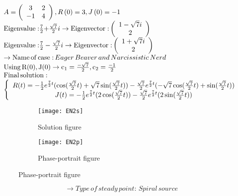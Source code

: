 \documentclass[a4paper]{article}
\begin{document}
\[\begin{array}{l}
A = \left( {\begin{array}{*{20}{c}}
3&2\\
{ - 1}&4
\end{array}} \right),R\left( 0 \right) = 3,J\left( 0 \right) =  - 1\\
{\rm{Eigenvalue:}}\frac{7}{2}{\rm{ + }}\frac{{\sqrt 7 }}{2}i \to {\rm{Eigenvector:}}\left( {\begin{array}{*{20}{c}}
{1 - \sqrt 7 i}\\
2
\end{array}} \right)\\
{\rm{Eigenvalue:}}\frac{7}{2} - \frac{{\sqrt 7 }}{2}i \to {\rm{Eigenvector:}}\left( {\begin{array}{*{20}{c}}
{1 + \sqrt 7 i}\\
2
\end{array}} \right)\\
 \to {\rm{Name}}\,{\rm{of}}\,{\rm{case:}}\,Eager\,Beaver\,and\,Narcissistic\,Nerd\\
{\rm{Using}}\,{\rm{R(0), J(0)}} \to {{\rm{c}}_1} = \frac{{ - \sqrt 7 }}{2},{\rm{ }}{{\rm{c}}_2} = \frac{{ - 1}}{2}\\
{\rm{Final}}\,{\rm{solution:}}\\
\left\{ {\begin{array}{*{20}{c}}
{R(t) =  - \frac{1}{2}{e^{\frac{7}{2}t}}(\cos (\frac{{\sqrt 7 }}{2}t) + \sqrt 7 \sin (\frac{{\sqrt 7 }}{2}t)) - \frac{{\sqrt 7 }}{2}{e^{\frac{7}{2}t}}( - \sqrt 7 \cos (\frac{{\sqrt 7 }}{2}t) + \sin (\frac{{\sqrt 7 }}{2}t))}\\
{J(t) =  - \frac{1}{2}{e^{\frac{7}{2}t}}(2\cos (\frac{{\sqrt 7 }}{2}t)) - \frac{{\sqrt 7 }}{2}{e^{\frac{7}{2}t}}(2\sin (\frac{{\sqrt 7 }}{2}t))}
\end{array}} \right.
\end{array}\]
\begin{figure}[H]
\centering
\begin{subfigure}{.5\textwidth}
  \centering
  \texttt{[image: EN2s]}
  \caption*{Solution figure}
\end{subfigure}%
\begin{subfigure}{.5\textwidth}
  \centering
  \texttt{[image: EN2p]}
  \caption*{Phase-portrait figure}
\end{subfigure}
\end{figure}
\[  \to  Type\,of\,steady\,point:\,Spiral\,source\]
\end{document}
